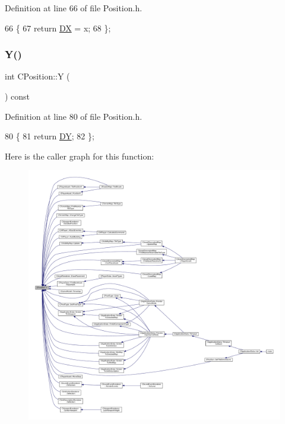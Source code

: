 Definition at line 66 of file Position.\+h.


\begin{DoxyCode}
66                     \{
67             \textcolor{keywordflow}{return} \hyperlink{classCPosition_a28445f9b872169715919074d82044eda}{DX} = x;  
68         \};
\end{DoxyCode}
\hypertarget{classCPosition_a1aa8a30e2f08dda1f797736ba8c13a87}{}\label{classCPosition_a1aa8a30e2f08dda1f797736ba8c13a87} 
\subsubsection{\texorpdfstring{Y()}{Y()}\hspace{0.1cm}{\footnotesize\ttfamily [1/2]}}
{\footnotesize\ttfamily int C\+Position\+::Y (\begin{DoxyParamCaption}{ }\end{DoxyParamCaption}) const\hspace{0.3cm}{\ttfamily [inline]}}



Definition at line 80 of file Position.\+h.


\begin{DoxyCode}
80                      \{
81             \textcolor{keywordflow}{return} \hyperlink{classCPosition_a84139c9e8eb547e7cf3cb851739943a4}{DY};
82         \};
\end{DoxyCode}
Here is the caller graph for this function\+:
\nopagebreak
\begin{figure}[H]
\begin{center}
\leavevmode
\includegraphics[width=350pt]{classCPosition_a1aa8a30e2f08dda1f797736ba8c13a87_icgraph}
\end{center}
\end{figure}
\hypertarget{classCPosition_a182107c1ded8662afc75f876fa1b990d}{}\label{classCPosition_a182107c1ded8662afc75f876fa1b990d} 
